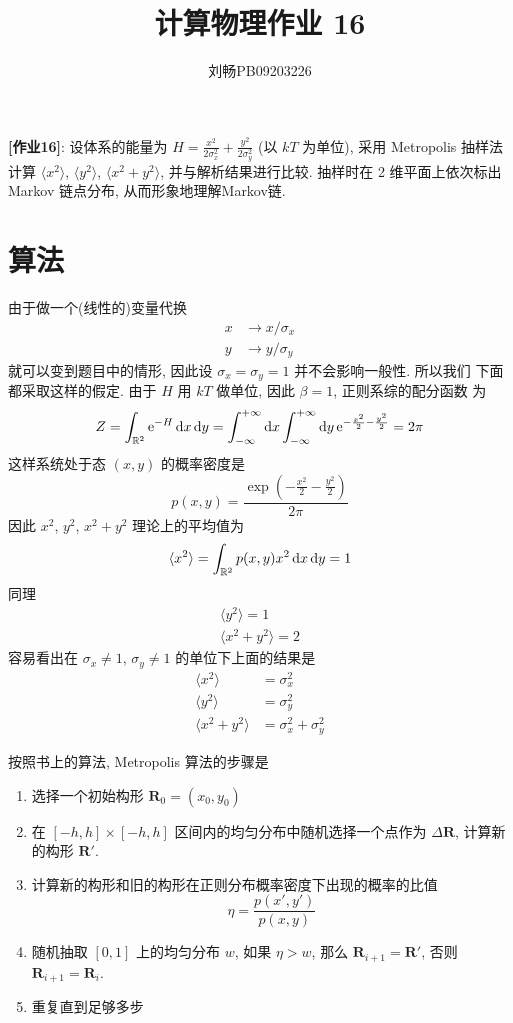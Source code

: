 \documentclass{ctexart}
\def\dd{{\rm d}}
\def\ee{{\rm e}}
\def\vec#1{\mathbf{#1}}
\begin{document}
\title{计算物理作业 16}
\author{刘畅\qquad PB09203226}
\maketitle

{\bf [作业16]}: 设体系的能量为 $H = \frac{x^2}{2\sigma_x^2} +
\frac{y^2}{2\sigma_y^2}$ (以 $kT$ 为单位), 采用 Metropolis 抽样法
计算 $\langle x^2\rangle$, $\langle y^2\rangle$, $\langle x^2+y^2\rangle$,
并与解析结果进行比较. 抽样时在 2 维平面上依次标出Markov 链点分布, 从而形象地理解Markov链.

\section{算法}
由于做一个(线性的)变量代换
\begin{align*}
x&\to x/\sigma_x\\
y&\to y/\sigma_y
\end{align*}
就可以变到题目中的情形, 因此设 $\sigma_x = \sigma_y = 1$ 并不会影响一般性. 所以我们
下面都采取这样的假定. 由于 $H$ 用 $kT$ 做单位, 因此 $\beta = 1$, 正则系综的配分函数
为
\[
Z = \int_{\mathbb{R}^2} \ee^{-H} \,\dd x\,\dd y=\int^{+\infty}_{-\infty}\dd x\int^{+\infty}_{-\infty}\dd y\,\ee^{-\frac{x^2}{2}-\frac{y^2}{2}}= 2\pi
\]
这样系统处于态 $(x,y)$ 的概率密度是
\[
p(x,y) = \frac{\exp\left(-\frac{x^2}{2}-\frac{y^2}{2}\right)}{2\pi}
\]
因此 $x^2$, $y^2$, $x^2+y^2$ 理论上的平均值为
\[
\langle x^2\rangle = \int_{\mathbb{R}^2}p(x,y)x^2\,\dd x\,\dd y = 1
\]
同理
\begin{align*}
\langle y^2\rangle = 1\\
\langle x^2+y^2\rangle = 2
\end{align*}
容易看出在 $\sigma_x\neq1$, $\sigma_y\neq1$ 的单位下上面的结果是
\begin{align*}
\langle x^2\rangle &= \sigma_x^2\\
\langle y^2\rangle &= \sigma_y^2\\
\langle x^2+y^2\rangle &= \sigma_x^2 + \sigma_y^2
\end{align*}

按照书上的算法, Metropolis 算法的步骤是
\begin{enumerate}
\item 选择一个初始构形 $\vec R_0 = (x_0,y_0)$
\item 在 $[-h,h]\times[-h,h]$ 区间内的均匀分布中随机选择一个点作为 $\Delta\vec R$,
计算新的构形 $\vec R'$.
\item 计算新的构形和旧的构形在正则分布概率密度下出现的概率的比值
\[
\eta = \frac{p(x',y')}{p(x,y)}
\]
\item 随机抽取 $[0,1]$ 上的均匀分布 $w$, 如果 $\eta > w$, 那么 $\vec R_{i+1} =
\vec R'$, 否则 $\vec R_{i+1} = \vec R_i$.
\item 重复直到足够多步
\end{enumerate}
\end{document}
